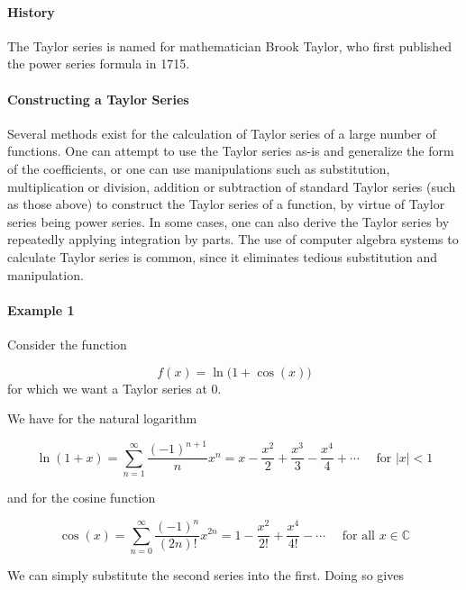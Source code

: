 \paragraph{History}



The Taylor series is named for mathematician Brook Taylor, who first published the power series formula in 1715.



\paragraph{Constructing a Taylor Series}



Several methods exist for the calculation of Taylor series of a large number of functions. One can attempt to use the Taylor series as-is and generalize the form of the coefficients, or one can use manipulations such as substitution, multiplication or division, addition or subtraction of standard Taylor series (such as those above) to construct the Taylor series of a function, by virtue of Taylor series being power series. In some cases, one can also derive the Taylor series by repeatedly applying integration by parts. The use of computer algebra systems to calculate Taylor series is common, since it eliminates tedious substitution and manipulation.



\paragraph{Example 1}



Consider the function



$$f(x)=\ln\big(1+\cos(x)\big)$$ for which we want a Taylor series at 0.



We have for the natural logarithm



$$\ln(1+x)=\sum _{n=1}^\infty\frac{(-1)^{n+1}}{n}x^n=x-\frac{x^2}{2}+\frac{x^3}{3}-\frac{x^4}{4}+\cdots\quad\text{ for }|x|<1$$

and for the cosine function



$$\cos(x)=\sum _{n=0}^\infty\frac{(-1)^n}{(2n)!}x^{2n}=1-\frac{x^2}{2!}+\frac{x^4}{4!}-\cdots\quad\text{ for all }x\in \mathbb{C}$$

We can simply substitute the second series into the first. Doing so gives



